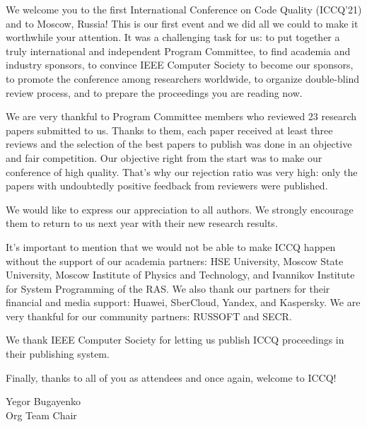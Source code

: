 \clearpage
{}

We welcome you to the first International Conference on Code Quality (ICCQ'21)
and to Moscow, Russia! This is our first event and we did all we could to make
it worthwhile your attention. It was a challenging task for us:
to put together a truly international and independent Program Committee,
to find academia and industry sponsors,
to convince IEEE Computer Society to become our sponsors,
to promote the conference among researchers worldwide,
to organize double-blind review process,
and to prepare the proceedings you are reading now.

We are very thankful to Program Committee members who
reviewed 23 research papers submitted to us. Thanks to them,
each paper received at least three reviews and the selection of the best papers to publish
was done in an objective and fair competition. Our objective right
from the start was to make our conference of high quality.
That's why our rejection ratio was very high: only the
papers with undoubtedly positive feedback from reviewers were published.

We would like to express our appreciation to all authors.
We strongly encourage them to return to us next year
with their new research results.

It's important to mention that we would not be able to make
ICCQ happen without the support of our academia partners:
HSE University,
Moscow State University,
Moscow Institute of Physics and Technology,
and Ivannikov Institute for System Programming of the RAS.
We also thank our partners for their financial and media support:
Huawei, SberCloud, Yandex, and Kaspersky.
We are very thankful for our community partners: RUSSOFT and SECR.

We thank IEEE Computer Society for letting us publish ICCQ proceedings
in their publishing system.

Finally, thanks to all of you as attendees and once again, welcome to ICCQ!

Yegor Bugayenko\\
Org Team Chair
